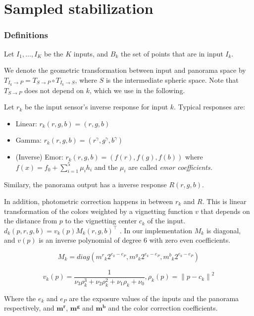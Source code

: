 \documentclass{article}
\begin{document}
\part {Sampled stabilization}

\section{Definitions}

Let $I_1, \dots, I_K$ be the $K$ inputs, and $B_k$ the set of points that are in input $I_k$.

We denote the geometric transformation between input and panorama space by $T_{I_k \rightarrow P} = T_{S \rightarrow P} \circ T_{I_k \rightarrow S}$,
where $S$ is the intermediate spheric space. Note that $T_{S \rightarrow P}$ does not depend on $k$, which we use in the following.

Let $r_k$ be the input sensor's inverse response for input $k$. Typical responses are:
\begin{itemize}
  \item Linear: $r_k(r, g, b) = (r, g, b)$
  \item Gamma: $r_k(r, g, b) = (r^\gamma, g^\gamma, b^\gamma)$
  \item (Inverse) Emor: $r_k(r, g, b) = (f(r), f(g), f(b))$ where $f(x) = f_0 + \sum_{i=1}^{5}{\mu_i h_i}$ and the $\mu_i$ are called \em{emor coefficients}.
\end{itemize}

Similary, the panorama output has a inverse response $R(r, g, b)$.

In addition, photometric correction happens in between $r_k$ and $R$.
This is linear transformation of the colors weighted by a vignetting function $v$ that depends on the distance from $p$ to the vignetting center $c_k$ of the input.
$d_k(p,r,g,b) = v_k(p) M_k (r,g,b)^\top$ . In our implementation $M_k$ is diagonal, and $v(p)$ is an inverse polynomial of degree $6$ with zero even coefficients.

\begin{equation}
  M_k = diag({m^r}_k 2^{e_k - e_P}, {m^g}_k 2^{e_k - e_P}, {m^b}_k 2^{e_k - e_P})
\end{equation}

\begin{equation}
  v_k(p) = \frac{1}{\nu_3 \rho_k^3 + \nu_2 \rho_k^2 + \nu_1 \rho_k + \nu_0}, \rho_k(p) = {\| p - c_k\|}^2
\end{equation}

Where the $e_k$ and $e_P$ are the exposure values of the inputs and the panorama respectively, and $\mathbf{m^r}$, $\mathbf{m^g}$ and $\mathbf{m^b}$ and the color correction coefficients.
\end{document}
